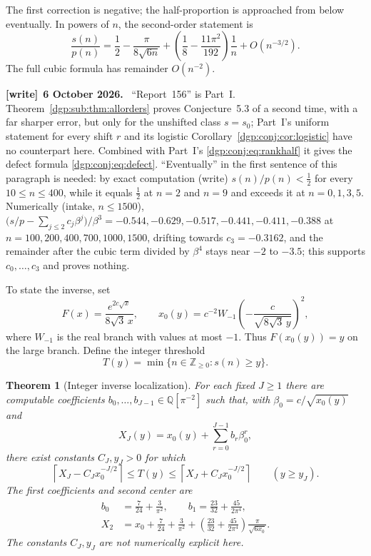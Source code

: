 \documentclass[11pt,letterpaper]{article}
\numberwithin{equation}{section}
\newtheorem{theorem}{Theorem}[section]
\theoremstyle{remark}\newtheorem{remark}[theorem]{Remark}
\newcommand{\QQ}{\mathbb Q}
\newcommand{\ZZ}{\mathbb Z}
\newcommand{\ceil}[1]{\left\lceil #1\right\rceil}
\newenvironment{writenote}[1][]{\par\smallskip\begingroup\small
 \noindent\textbf{[write]}\if\relax\detokenize{#1}\relax\else~\textbf{#1.}\fi\ }%
 {\par\endgroup\smallskip}
\begin{document}
The first correction is negative; the half-proportion is approached
from below eventually. In powers of $n$, the second-order statement is
\[
 \frac{s(n)}{p(n)}=\frac12-\frac\pi{8\sqrt{6n}}
 +\left(\frac18-\frac{11\pi^2}{192}\right)\frac1n
 +O(n^{-3/2}).
\]
The full cubic formula has remainder $O(n^{-2})$.
\begin{writenote}[6 October 2026]
``Report~156'' \cite{r156} is Part~I. Theorem~\ref{dgp:sub:thm:allorders} proves Conjecture~5.3 of \cite{abek} a second time, with a far sharper error, but only for the unshifted class $s=s_0$; Part~I's uniform statement for every shift $r$ and its logistic Corollary~\ref{dgp:conj:cor:logistic} have no counterpart here. Combined with Part~I's \eqref{dgp:conj:eq:rankhalf} it gives the defect formula \eqref{dgp:conj:eq:defect}. ``Eventually'' in the first sentence of this paragraph is needed: by exact computation (write) $s(n)/p(n)<\frac12$ for every $10\le n\le400$, while it equals $\frac12$ at $n=2$ and $n=9$ and exceeds it at $n=0,1,3,5$. Numerically (intake, $n\le1500$), $\bigl(s/p-\sum_{j\le2}c_j\beta^j\bigr)/\beta^3=-0.544,-0.629,-0.517,-0.441,-0.411,-0.388$ at $n=100,200,400,700,1000,1500$, drifting towards $c_3=-0.3162$, and the remainder after the cubic term divided by $\beta^4$ stays near $-2$ to $-3.5$; this supports $c_0,\dots,c_3$ and proves nothing.
\end{writenote}

To state the inverse, set
\begin{equation}\label{dgp:sub:eq:F}
 F(x)=\frac{e^{2c\sqrt x}}{8\sqrt3\,x},\qquad
 x_0(y)=c^{-2}W_{-1}\!\left(-\frac{c}{\sqrt{8\sqrt3\,y}}\right)^2,
\end{equation}
where $W_{-1}$ is the real branch with values at most $-1$. Thus
$F(x_0(y))=y$ on the large branch. Define the integer threshold
\begin{equation}\label{dgp:sub:eq:T}
 T(y)=\min\{n\in\ZZ_{\geq0}:s(n)\geq y\}.
\end{equation}

\begin{theorem}[Integer inverse localization]\label{dgp:sub:thm:inverse}
For each fixed $J\geq1$ there are computable coefficients
$b_0,\ldots,b_{J-1}\in\QQ[\pi^{-2}]$ such that, with
$\beta_0=c/\sqrt{x_0(y)}$ and
\begin{equation}\label{dgp:sub:eq:XJ}
 X_J(y)=x_0(y)+\sum_{r=0}^{J-1}b_r\beta_0^r,
\end{equation}
there exist constants $C_J,y_J>0$ for which
\begin{equation}\label{dgp:sub:eq:inverseceil}
 \ceil{X_J-C_Jx_0^{-J/2}}\leq T(y)
 \leq\ceil{X_J+C_Jx_0^{-J/2}}\qquad(y\geq y_J).
\end{equation}
The first coefficients and second center are
\begin{align}
 b_0&=\frac7{24}+\frac3{\pi^2},\qquad
 b_1=\frac{23}{32}+\frac{45}{2\pi^4},\label{dgp:sub:eq:b01}\\
 X_2&=x_0+\frac7{24}+\frac3{\pi^2}
       +\left(\frac{23}{32}+\frac{45}{2\pi^4}\right)
          \frac\pi{\sqrt{6x_0}}.\label{dgp:sub:eq:X2}
\end{align}
The constants $C_J,y_J$ are not numerically explicit here.
\end{theorem}
\end{document}
